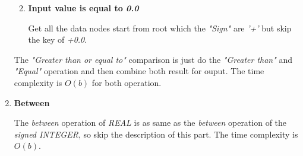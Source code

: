 \begin{enumerate}
\begin{enumerate}
\begin{enumerate}
\end{enumerate}

\item \textbf{Input value is equal to \textit{0.0}}

Get all the data nodes start from root which the \textit{"Sign"} are \textit{'+'} but skip the key of \textit{+0.0}.

\end{enumerate}

The \emph{"Greater than or equal to"} comparison is just do the \emph{"Greater than"} and \emph{"Equal"} operation and then combine both result for ouput. The time complexity is $O(b)$ for both operation.


\item \textbf{Between}

The \textit{between} operation of \textit{REAL} is as same as the \textit{between} operation of the \textit{signed INTEGER}, so skip the description of this part. The time complexity is $O(b)$.


\end{enumerate}
